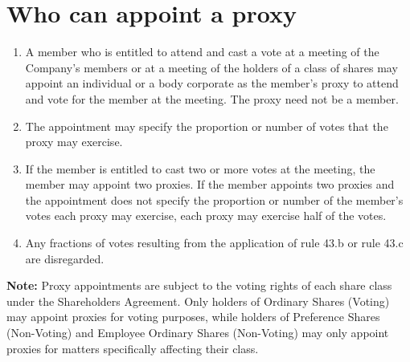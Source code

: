 \section{Who can appoint a proxy}

\begin{enumerate}[label=(\alph*)]
    \item A member who is entitled to attend and cast a vote at a meeting of the Company's members or at a meeting of the holders of a class of shares may appoint an individual or a body corporate as the member's proxy to attend and vote for the member at the meeting. The proxy need not be a member.
    
    \item The appointment may specify the proportion or number of votes that the proxy may exercise.
    
    \item If the member is entitled to cast two or more votes at the meeting, the member may appoint two proxies. If the member appoints two proxies and the appointment does not specify the proportion or number of the member's votes each proxy may exercise, each proxy may exercise half of the votes.
    
    \item Any fractions of votes resulting from the application of rule 43.b or rule 43.c are disregarded.
\end{enumerate}

\textbf{Note:} Proxy appointments are subject to the voting rights of each share class under the Shareholders Agreement. Only holders of Ordinary Shares (Voting) may appoint proxies for voting purposes, while holders of Preference Shares (Non-Voting) and Employee Ordinary Shares (Non-Voting) may only appoint proxies for matters specifically affecting their class. 